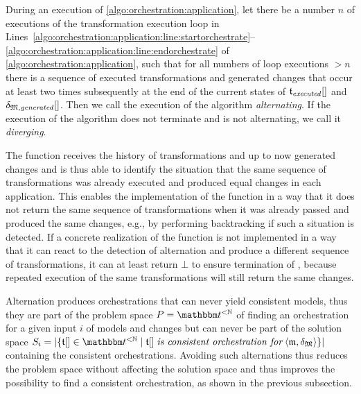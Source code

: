 \begin{definition}
    \label{def:applyalternation}
    During an execution of \autoref{algo:orchestration:application}, let there be a number $n$ of executions of the transformation execution loop in Lines~\ref{algo:orchestration:application:line:startorchestrate}--\ref{algo:orchestration:application:line:endorchestrate} of \autoref{algo:orchestration:application}, such that for all numbers of loop executions $> n$ there is a sequence of executed transformations and generated changes that occur at least two times subsequently at the end of the current states of $\applyalgexecuted$ and $\applyalggenerated$.
    Then we call the execution of the algorithm \emph{alternating}.
    If the execution of the algorithm does not terminate and is not alternating, we call it \emph{diverging}.
\end{definition}

The  function receives the history of transformations and up to now generated changes and is thus able to identify the situation that the same sequence of transformations was already executed and produced equal changes in each application.
This enables the implementation of the function in a way that it does not return the same sequence of transformations when it was already passed and produced the same changes, e.g., by performing backtracking if such a situation is detected.
If a concrete realization of the  function is not implemented in a way that it can react to the detection of alternation and produce a different sequence of transformations, it can at least return $\bot$ to ensure termination of , because repeated execution of the same transformations will still return the same changes. 

Alternation produces orchestrations that can never yield consistent models, thus they are part of the problem space $P = {\transformationset{T}^{< \mathbb{N}}}$ of finding an orchestration for a given input $i$ of models and changes but can never be part of the solution space $S_{i} = \abs{\setted{\sequence{\transformation{t}} \in \transformationset{T}^{< \mathbb{N}} \mid \sequence{\transformation{t}} \mathtextspacearound{is consistent orchestration for} \tupled{\modeltuple{m}, \changetuple{\metamodeltuple{M}}}}}$ containing the consistent orchestrations.
Avoiding such alternations thus reduces the problem space without affecting the solution space and thus improves the possibility to find a consistent orchestration, as shown in the previous subsection.

